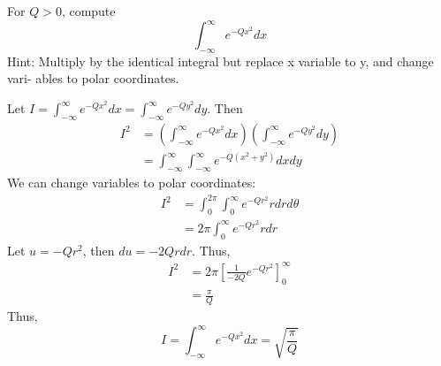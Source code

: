 \documentclass[plain]{pset}
\begin{document}
\pagebreak

\begin{problem}
For \(Q > 0\), compute
\[\int_{-\infty}^{\infty} e^{-Qx^2}dx\]
Hint: Multiply by the identical integral but replace x variable to y, and change vari- ables to polar coordinates.
\end{problem}
\begin{solution}
    Let \(I = \int_{-\infty}^{\infty} e^{-Qx^2}dx = \int_{-\infty}^{\infty} e^{-Qy^2}dy\). Then
    \begin{align*}
        I^2 & = \left(\int_{-\infty}^{\infty} e^{-Qx^2}dx\right)\left(\int_{-\infty}^{\infty} e^{-Qy^2}dy\right) \\
            & = \int_{-\infty}^{\infty}\int_{-\infty}^{\infty} e^{-Q(x^2 + y^2)}dxdy
    \end{align*}
    We can change variables to polar coordinates:
    \begin{align*}
        I^2 & = \int_{0}^{2\pi}\int_{0}^{\infty} e^{-Qr^2}rdrd\theta \\
            & = 2\pi\int_{0}^{\infty} e^{-Qr^2}rdr
    \end{align*}
    Let \(u = -Qr^2\), then \(du = -2Qrdr\). Thus,
    \begin{align*}
        I^2 & = 2\pi\left[\frac{1}{-2Q}e^{-Qr^2}\right]_0^{\infty} \\
            & = \frac{\pi}{Q}
    \end{align*}
    Thus,
    \[I = \int_{-\infty}^{\infty} e^{-Qx^2}dx = \sqrt{\frac{\pi}{Q}}\]
\end{solution}

\pagebreak
\end{document}
